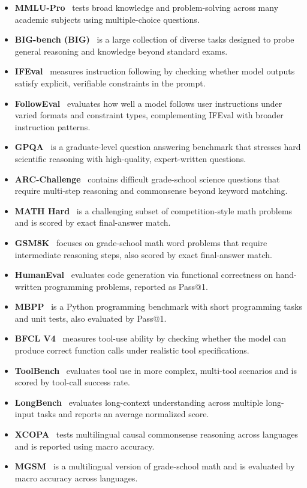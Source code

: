 \begin{itemize}
    \item \textbf{MMLU-Pro}~\citep{wang2024mmluprorobustchallengingmultitask} tests broad knowledge and problem-solving across many academic subjects using multiple-choice questions. 
    \item \textbf{BIG-bench (BIG)}~\citep{suzgun2022challenging} is a large collection of diverse tasks designed to probe general reasoning and knowledge beyond standard exams.
    \item \textbf{IFEval}~\citep{zhou2023instructionfollowing} measures instruction following by checking whether model outputs satisfy explicit, verifiable constraints in the prompt.
    \item \textbf{FollowEval}~\citep{jing2023followeval} evaluates how well a model follows user instructions under varied formats and constraint types, complementing IFEval with broader instruction patterns.
    \item \textbf{GPQA}~\citep{rein2024gpqa} is a graduate-level question answering benchmark that stresses hard scientific reasoning with high-quality, expert-written questions.
    \item \textbf{ARC-Challenge}~\citep{Clark2018ThinkYH} contains difficult grade-school science questions that require multi-step reasoning and commonsense beyond keyword matching.
    \item \textbf{MATH Hard}~\citep{hendrycksmath2021} is a challenging subset of competition-style math problems and is scored by exact final-answer match.
    \item \textbf{GSM8K}~\citep{cobbe2021training} focuses on grade-school math word problems that require intermediate reasoning steps, also scored by exact final-answer match.
    \item \textbf{HumanEval}~\citep{chen2021codex} evaluates code generation via functional correctness on hand-written programming problems, reported as Pass@1.
    \item \textbf{MBPP}~\citep{austin2021program} is a Python programming benchmark with short programming tasks and unit tests, also evaluated by Pass@1.
    \item \textbf{BFCL V4}~\citep{berkeley-function-calling-leaderboard} measures tool-use ability by checking whether the model can produce correct function calls under realistic tool specifications.
    \item \textbf{ToolBench}~\citep{xu2023tool} evaluates tool use in more complex, multi-tool scenarios and is scored by tool-call success rate.
    \item \textbf{LongBench}~\citep{bai2024longbench} evaluates long-context understanding across multiple long-input tasks and reports an average normalized score.
    \item \textbf{XCOPA}~\citep{ponti2020xcopa} tests multilingual causal commonsense reasoning across languages and is reported using macro accuracy.
    \item \textbf{MGSM}~\citep{shi2022language} is a multilingual version of grade-school math and is evaluated by macro accuracy across languages.
\end{itemize}

